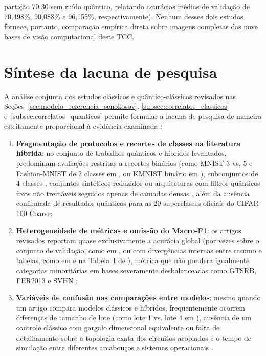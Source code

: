 \documentclass[
    12pt,
    openright,
    oneside,
    a4paper,
    english,
    brazil
]{abntex2}
\begin{document}
partição 70:30 sem ruído quântico, relatando acurácias médias de validação de 70,498\%, 90,088\% e 96,155\%, respectivamente). Nenhum desses dois estudos fornece, portanto, comparação empírica direta sobre imagens completas das nove bases de visão computacional deste TCC.

\section{Síntese da lacuna de pesquisa}
\label{sec:lacuna_pesquisa}

A análise conjunta dos estudos clássicos e quântico-clássicos revisados nas Seções~\ref{sec:modelo_referencia_senokosov}, \ref{subsec:correlatos_classicos} e~\ref{subsec:correlatos_quanticos} permite formular a lacuna de pesquisa de maneira estritamente proporcional à evidência examinada \cite{Wazlawick2020}:
\begin{enumerate}
    \item \textbf{Fragmentação de protocolos e recortes de classes na literatura híbrida}: no conjunto de trabalhos quânticos e híbridos levantados, predominam avaliações restritas a recortes binários (como MNIST 3 vs. 5 e Fashion-MNIST de 2 classes em , ou KMNIST binário em ), subconjuntos de 4 classes \cite{bokhan2022qcnn}, conjuntos sintéticos reduzidos \cite{daka2026noqcnn} ou arquiteturas com filtros quânticos fixos não treináveis seguidos apenas de camadas densas \cite{riaz2023nnqe,riaz2026emnist}, além da ausência confirmada de resultados quânticos para as 20 superclasses oficiais do CIFAR-100 Coarse;
    \item \textbf{Heterogeneidade de métricas e omissão do Macro-F1}: os artigos revisados reportam quase exclusivamente a acurácia global (por vezes sobre o conjunto de validação, como em , ou com divergências internas entre resumo e tabelas, como em  e na Tabela~I de ), métrica que não pondera igualmente categorias minoritárias em bases severamente desbalanceadas como GTSRB, FER2013 e SVHN \cite{fawcett2006roc,sokolova2009systematic};
    \item \textbf{Variáveis de confusão nas comparações entre modelos}: mesmo quando um artigo compara modelos clássicos e híbridos, frequentemente ocorrem diferenças de tamanho de lote (como lote 1 vs. lote 4 em ), ausência de um controle clássico com gargalo dimensional equivalente ou falta de detalhamento sobre a topologia exata dos circuitos acoplados e o tempo de simulação entre diferentes arcabouços e sistemas operacionais \cite{senokosov2024qml,Wazlawick2020}.
\end{enumerate}
\end{document}

